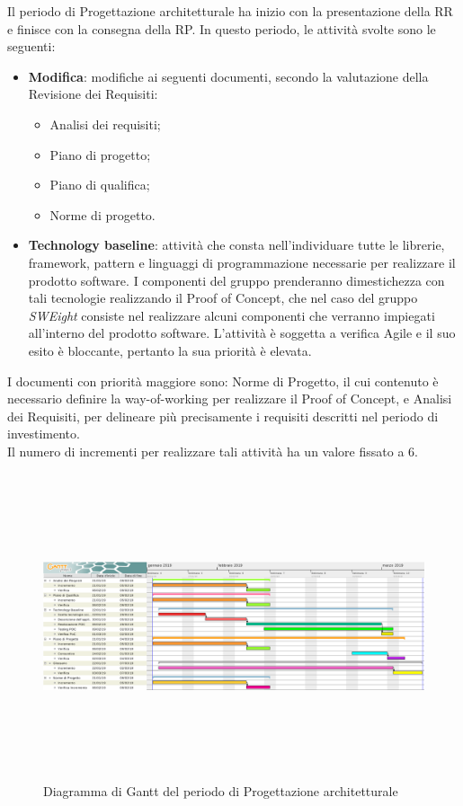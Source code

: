 Il periodo di Progettazione architetturale ha inizio con la presentazione della RR e finisce con la consegna della RP.\newline
In questo periodo, le attività svolte sono le seguenti:
\begin{itemize}
	\item \textbf{Modifica}: modifiche ai seguenti documenti, secondo la valutazione della Revisione dei Requisiti:
	\begin{itemize}
		\item Analisi dei requisiti;
		\item Piano di progetto;
		\item Piano di qualifica;
		\item Norme di progetto.
	\end{itemize}
	\item \textbf{Technology baseline}: attività che consta nell'individuare tutte le librerie, framework, pattern e linguaggi di programmazione necessarie per realizzare il prodotto software. I componenti del gruppo prenderanno dimestichezza con tali tecnologie realizzando il Proof of Concept, che nel caso del gruppo \textit{SWEight} consiste nel realizzare alcuni componenti che verranno impiegati all'interno del prodotto software. L'attività è soggetta a verifica {Agile} e il suo esito è bloccante, pertanto la sua priorità è elevata. 
\end{itemize}
I documenti con priorità maggiore sono: Norme di Progetto, il cui contenuto è necessario definire la {way-of-working} per realizzare il {Proof of Concept}, e Analisi dei Requisiti, per delineare più precisamente i requisiti descritti nel periodo di investimento. \\
Il numero di incrementi per realizzare tali attività ha un valore fissato a 6.

\begin{figure}[H]
	\centering
	\hspace*{-1.5cm}
		\includegraphics[width=19.4cm, height=9cm]{Pianificazione/Progettazione.pdf}
	\caption{Diagramma di Gantt del periodo di Progettazione architetturale}
\end{figure}
